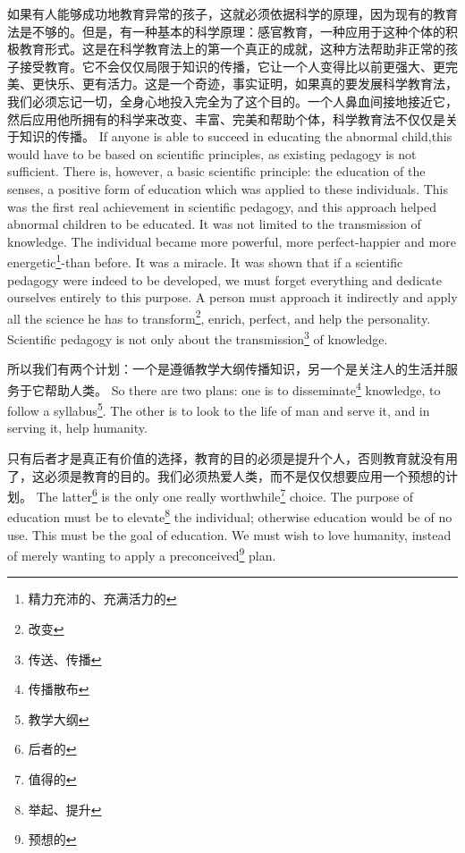 \documentclass[lang=cn,10pt]{elegantbook}
\begin{document}
\begin{tcolorbox}[title=译文,
colback=red!5!white,
colframe=red!75!black,
fonttitle=\bfseries]
如果有人能够成功地教育异常的孩子，这就必须依据科学的原理，因为现有的教育法是不够的。但是，有一种基本的科学原理：感官教育，一种应用于这种个体的积极教育形式。这是在科学教育法上的第一个真正的成就，这种方法帮助非正常的孩子接受教育。它不会仅仅局限于知识的传播，它让一个人变得比以前更强大、更完美、更快乐、更有活力。这是一个奇迹，事实证明，如果真的要发展科学教育法，我们必须忘记一切，全身心地投入完全为了这个目的。一个人鼻血间接地接近它，然后应用他所拥有的科学来改变、丰富、完美和帮助个体，科学教育法不仅仅是关于知识的传播。
If anyone is able to succeed in educating the abnormal child,this would have to be based on scientific principles, as existing pedagogy is not sufficient. There is, however, a basic scientific principle: the education of the senses, a positive form of education which was applied to these individuals. This was the first real achievement in scientific pedagogy, and this approach helped abnormal children to be educated. It was not limited to the transmission of knowledge. The individual became more powerful, more perfect-happier and more energetic\footnote{精力充沛的、充满活力的}-than before. It was a miracle. It was shown that if a scientific pedagogy were indeed to be developed, we must forget everything and dedicate ourselves entirely to this purpose. A person must approach it indirectly and apply all the science he has to transform\footnote{改变}, enrich, perfect, and help the personality. Scientific pedagogy is not only about the transmission\footnote{传送、传播} of knowledge.
\end{tcolorbox}

\begin{tcolorbox}[title=译文,
colback=red!5!white,
colframe=red!75!black,
fonttitle=\bfseries]
所以我们有两个计划：一个是遵循教学大纲传播知识，另一个是关注人的生活并服务于它帮助人类。
So there are two plans: one is to disseminate\footnote{传播散布} knowledge, to follow a syllabus\footnote{教学大纲}. The other is to look to the life of man and serve it, and in serving it, help humanity.
\end{tcolorbox}

\begin{tcolorbox}[title=译文,
colback=red!5!white,
colframe=red!75!black,
fonttitle=\bfseries]
只有后者才是真正有价值的选择，教育的目的必须是提升个人，否则教育就没有用了，这必须是教育的目的。我们必须热爱人类，而不是仅仅想要应用一个预想的计划。
The latter\footnote{后者的} is the only one really worthwhile\footnote{值得的} choice. The purpose of education must be to elevate\footnote{举起、提升} the individual; otherwise education would be of no use. This must be the goal of education. We must wish to love humanity, instead of merely wanting to apply a preconceived\footnote{预想的} plan.
\end{tcolorbox}
\end{document}
